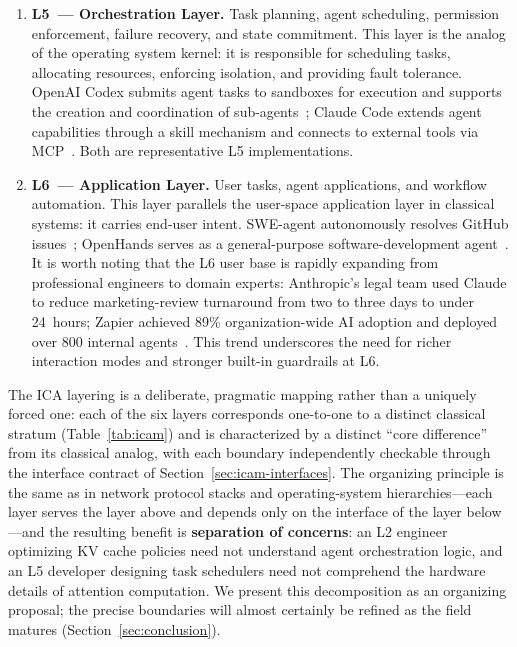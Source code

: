\begin{definition}
\begin{enumerate}[nosep]
\item \textbf{L5~--- Orchestration Layer.}
Task planning, agent scheduling, permission enforcement, failure recovery, and state commitment. This layer is the analog of the operating system kernel: it is responsible for scheduling tasks, allocating resources, enforcing isolation, and providing fault tolerance. OpenAI Codex submits agent tasks to sandboxes for execution and supports the creation and coordination of sub-agents~\cite{openai_codex_overview_2026}; Claude Code extends agent capabilities through a skill mechanism and connects to external tools via MCP~\cite{anthropic_claudecode_overview_2026,anthropic_claudecode_skills_2026}. Both are representative L5 implementations.

\item \textbf{L6~--- Application Layer.}
User tasks, agent applications, and workflow automation. This layer parallels the user-space application layer in classical systems: it carries end-user intent. SWE-agent autonomously resolves GitHub issues~\cite{sweagent2024}; OpenHands serves as a general-purpose software-development agent~\cite{openhands_paper_2025}. It is worth noting that the L6 user base is rapidly expanding from professional engineers to domain experts: Anthropic's legal team used Claude to reduce marketing-review turnaround from two to three days to under 24~hours; Zapier achieved 89\% organization-wide AI adoption and deployed over 800 internal agents~\cite{anthropic2026agenticreport}. This trend underscores the need for richer interaction modes and stronger built-in guardrails at L6.
\end{enumerate}
\end{definition}

The ICA layering is a deliberate, pragmatic mapping rather than a uniquely forced one: each of the six layers corresponds one-to-one to a distinct classical stratum (Table~\ref{tab:icam}) and is characterized by a distinct ``core difference'' from its classical analog, with each boundary independently checkable through the interface contract of Section~\ref{sec:icam-interfaces}. The organizing principle is the same as in network protocol stacks and operating-system hierarchies---each layer serves the layer above and depends only on the interface of the layer below---and the resulting benefit is \textbf{separation of concerns}: an L2 engineer optimizing KV cache policies need not understand agent orchestration logic, and an L5 developer designing task schedulers need not comprehend the hardware details of attention computation. We present this decomposition as an organizing proposal; the precise boundaries will almost certainly be refined as the field matures (Section~\ref{sec:conclusion}).

